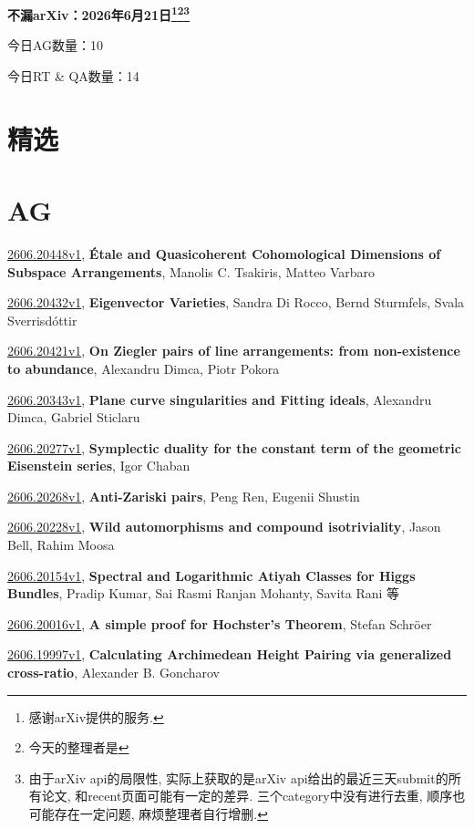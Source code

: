 \documentclass[9pt, a4paper]{article}
\theoremstyle{plain}
\theoremstyle{definition}
\theoremstyle{remark}
\newcommand{\arxiv}[3]{\href{https://arxiv.org/abs/#1}{#1}, \textbf{\textcolor{arxivblue}{#2}}, #3}
\newcommand{\AGnumber}{10}
\newcommand{\RTQAnumber}{14}
\newcommand{\NewestDate}{2026年6月21日}
\newcommand{\todayarXiver}{} %
\begin{document}
\begin{center}
    \Huge\textbf{不漏arXiv：\NewestDate\footnote{感谢arXiv提供的服务.}\footnote{今天的整理者是\todayarXiver}\footnote{由于arXiv api的局限性, 实际上获取的是arXiv api给出的最近三天submit的所有论文, 和recent页面可能有一定的差异. 三个category中没有进行去重, 顺序也可能存在一定问题, 麻烦整理者自行增删.}} \\
\end{center}

\setcounter{section}{-1}

\begin{center}
    今日AG数量：\AGnumber
    
    今日RT \& QA数量：\RTQAnumber
    
\end{center}


\section{精选}


\section{AG}
\arxiv{2606.20448v1}{Étale and Quasicoherent Cohomological Dimensions of Subspace Arrangements}{Manolis C. Tsakiris, Matteo Varbaro}

\arxiv{2606.20432v1}{Eigenvector Varieties}{Sandra Di Rocco, Bernd Sturmfels, Svala Sverrisdóttir}

\arxiv{2606.20421v1}{On Ziegler pairs of line arrangements: from non-existence to abundance}{Alexandru Dimca, Piotr Pokora}

\arxiv{2606.20343v1}{Plane curve singularities and Fitting ideals}{Alexandru Dimca, Gabriel Sticlaru}

\arxiv{2606.20277v1}{Symplectic duality for the constant term of the geometric Eisenstein series}{Igor Chaban}

\arxiv{2606.20268v1}{Anti-Zariski pairs}{Peng Ren, Eugenii Shustin}

\arxiv{2606.20228v1}{Wild automorphisms and compound isotriviality}{Jason Bell, Rahim Moosa}

\arxiv{2606.20154v1}{Spectral and Logarithmic Atiyah Classes for Higgs Bundles}{Pradip Kumar, Sai Rasmi Ranjan Mohanty, Savita Rani 等}

\arxiv{2606.20016v1}{A simple proof for Hochster's Theorem}{Stefan Schröer}

\arxiv{2606.19997v1}{Calculating Archimedean Height Pairing via generalized cross-ratio}{Alexander B. Goncharov}
\end{document}
